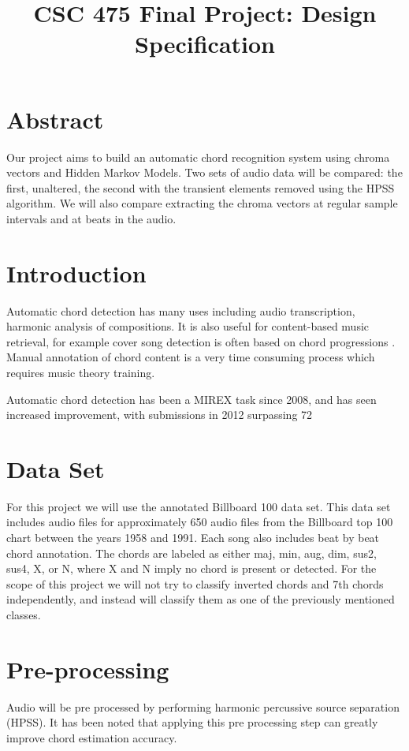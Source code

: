 \documentclass{article}
\title{CSC 475 Final Project: Design Specification}
\begin{document}
%
\maketitle
%

\section{Abstract}\label{sec:desoutline}
Our project aims to build an automatic chord recognition system using chroma
vectors and Hidden Markov Models. Two sets of audio data will be compared: the
first, unaltered, the second with the transient elements removed using the HPSS
algorithm. We will also compare extracting the chroma vectors at regular sample
intervals and at beats in the audio.

\section{Introduction}\label{sec:intro}

Automatic chord detection has many uses including audio transcription, harmonic
analysis of compositions. It is also useful for content-based music retrieval,
for example cover song detection is often based on chord progressions
\cite{Papadopoulos:18}.  Manual annotation of chord content is a very time
consuming process which requires music theory training. 

Automatic chord detection has been a MIREX task since 2008, and has seen increased
improvement, with submissions in 2012 surpassing 72%

\section{Data Set}

For this project we will use the annotated Billboard 100 data set. This data
set includes audio files for approximately 650 audio files from the Billboard
top 100 chart between the years 1958 and 1991. Each song also includes beat by
beat chord annotation\cite{Burgoyne:07}. The chords are labeled as either maj,
min, aug, dim, sus2, sus4, X, or N, where X and N imply no chord is present or
detected.  For the scope of this project we will not try to classify inverted
chords and 7th chords independently, and instead will classify them as one of
the previously mentioned classes.

\section{Pre-processing}
Audio will be pre processed by performing harmonic percussive source separation
(HPSS). It has been noted that applying this pre processing step can greatly
improve chord estimation accuracy\cite{Reed:09}.
\end{document}
